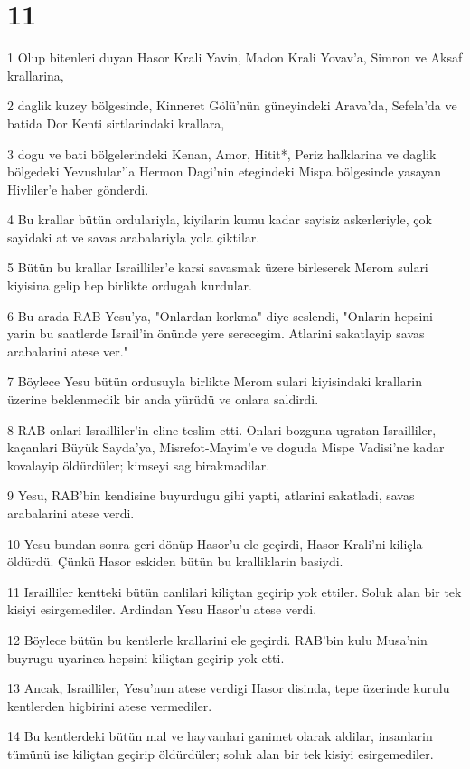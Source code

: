 \chapter{11}

\par 1 Olup bitenleri duyan Hasor Krali Yavin, Madon Krali Yovav'a, Simron ve Aksaf krallarina,
\par 2 daglik kuzey bölgesinde, Kinneret Gölü'nün güneyindeki Arava'da, Sefela'da ve batida Dor Kenti sirtlarindaki krallara,
\par 3 dogu ve bati bölgelerindeki Kenan, Amor, Hitit*, Periz halklarina ve daglik bölgedeki Yevuslular'la Hermon Dagi'nin etegindeki Mispa bölgesinde yasayan Hivliler'e haber gönderdi.
\par 4 Bu krallar bütün ordulariyla, kiyilarin kumu kadar sayisiz askerleriyle, çok sayidaki at ve savas arabalariyla yola çiktilar.
\par 5 Bütün bu krallar Israilliler'e karsi savasmak üzere birleserek Merom sulari kiyisina gelip hep birlikte ordugah kurdular.
\par 6 Bu arada RAB Yesu'ya, "Onlardan korkma" diye seslendi, "Onlarin hepsini yarin bu saatlerde Israil'in önünde yere serecegim. Atlarini sakatlayip savas arabalarini atese ver."
\par 7 Böylece Yesu bütün ordusuyla birlikte Merom sulari kiyisindaki krallarin üzerine beklenmedik bir anda yürüdü ve onlara saldirdi.
\par 8 RAB onlari Israilliler'in eline teslim etti. Onlari bozguna ugratan Israilliler, kaçanlari Büyük Sayda'ya, Misrefot-Mayim'e ve doguda Mispe Vadisi'ne kadar kovalayip öldürdüler; kimseyi sag birakmadilar.
\par 9 Yesu, RAB'bin kendisine buyurdugu gibi yapti, atlarini sakatladi, savas arabalarini atese verdi.
\par 10 Yesu bundan sonra geri dönüp Hasor'u ele geçirdi, Hasor Krali'ni kiliçla öldürdü. Çünkü Hasor eskiden bütün bu kralliklarin basiydi.
\par 11 Israilliler kentteki bütün canlilari kiliçtan geçirip yok ettiler. Soluk alan bir tek kisiyi esirgemediler. Ardindan Yesu Hasor'u atese verdi.
\par 12 Böylece bütün bu kentlerle krallarini ele geçirdi. RAB'bin kulu Musa'nin buyrugu uyarinca hepsini kiliçtan geçirip yok etti.
\par 13 Ancak, Israilliler, Yesu'nun atese verdigi Hasor disinda, tepe üzerinde kurulu kentlerden hiçbirini atese vermediler.
\par 14 Bu kentlerdeki bütün mal ve hayvanlari ganimet olarak aldilar, insanlarin tümünü ise kiliçtan geçirip öldürdüler; soluk alan bir tek kisiyi esirgemediler.
